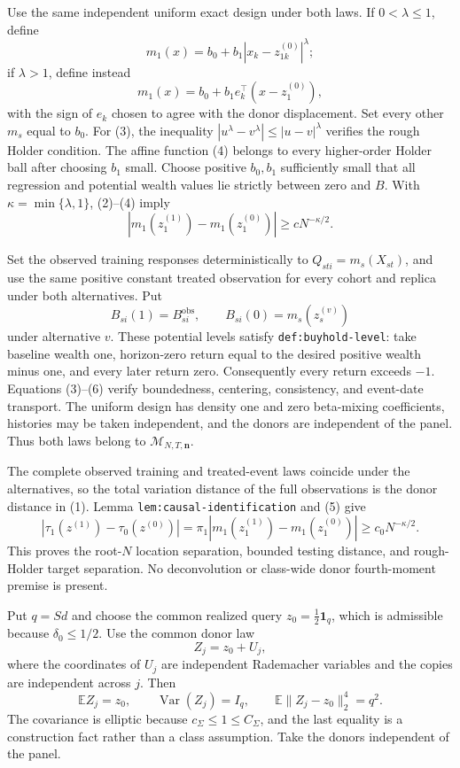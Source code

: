 Use the same independent uniform exact design under both laws.  If
\(0<\lambda\le1\), define
\[
 m_1(x)=b_0+b_1|x_k-z^{(0)}_{1k}|^\lambda;                  \tag{3}
\]
if \(\lambda>1\), define instead
\[
 m_1(x)=b_0+b_1e_k^\top(x-z^{(0)}_1),                       \tag{4}
\]
with the sign of \(e_k\) chosen to agree with the donor displacement.  Set every other \(m_s\) equal to \(b_0\).  For (3), the inequality
\(|u^\lambda-v^\lambda|\le|u-v|^\lambda\) verifies the rough Holder condition.  The affine function (4) belongs to every higher-order Holder ball after choosing \(b_1\) small.  Choose positive \(b_0,b_1\) sufficiently small that all regression and potential wealth values lie strictly between zero and \(B\).  With \(\kappa=\min\{\lambda,1\}\), (2)--(4) imply
\[
 |m_1(z_1^{(1)})-m_1(z_1^{(0)})|
 \ge cN^{-\kappa/2}.                                       \tag{5}
\]

Set the observed training responses deterministically to
\(Q_{sti}=m_s(X_{st})\), and use the same positive constant treated observation for every cohort and replica under both alternatives.  Put
\[
 B_{si}(1)=B_{si}^{\mathrm{obs}},
 \qquad B_{si}(0)=m_s(z_s^{(v)})                             \tag{6}
\]
under alternative \(v\).  These potential levels satisfy
\texttt{def:buyhold-level}: take baseline wealth one, horizon-zero return equal to the desired positive wealth minus one, and every later return zero.  Consequently every return exceeds \(-1\).  Equations (3)--(6) verify boundedness, centering, consistency, and event-date transport.  The uniform design has density one and zero beta-mixing coefficients, histories may be taken independent, and the donors are independent of the panel.  Thus both laws belong to \(\mathcal M_{N,T,\mathbf n}\).

The complete observed training and treated-event laws coincide under the alternatives, so the total variation distance of the full observations is the donor distance in (1).  Lemma \texttt{lem:causal-identification} and (5) give
\[
 |\tau_1(z^{(1)})-\tau_0(z^{(0)})|
 =\pi_1|m_1(z_1^{(1)})-m_1(z_1^{(0)})|
 \ge c_0N^{-\kappa/2}.                                     \tag{7}
\]
This proves the root-\(N\) location separation, bounded testing distance, and rough-Holder target separation.  No deconvolution or class-wide donor fourth-moment premise is present.

Put \(q=Sd\) and choose the common realized query
\(z_0=\tfrac12\mathbf1_q\), which is admissible because \(\delta_0\le1/2\).  Use the common donor law
\[
 Z_j=z_0+U_j,                                                \tag{1}
\]
where the coordinates of \(U_j\) are independent Rademacher variables and the copies are independent across \(j\).  Then
\[
 \mathbb EZ_j=z_0,
 \qquad \operatorname{Var}(Z_j)=I_q,
 \qquad \mathbb E\|Z_j-z_0\|_2^4=q^2.                     \tag{2}
\]
The covariance is elliptic because \(c_\Sigma\le1\le C_\Sigma\), and the last equality is a construction fact rather than a class assumption.  Take the donors independent of the panel.

